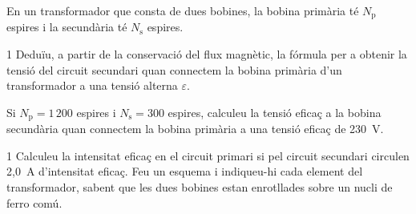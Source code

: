 En un transformador que consta de dues bobines, la bobina primària té $N_\mathrm{p}$ espires i la secundària té $N_\mathrm{s}$ espires.

\begin{apartat}{1}
Deduïu, a partir de la conservació del flux magnètic, la fórmula per a obtenir la tensió del circuit secundari quan connectem la bobina primària d'un transformador a una tensió alterna $\varepsilon$.

Si $N_\mathrm{p} = 1\,200$ espires i $N_\mathrm{s} = 300$ espires, calculeu la tensió eficaç a la bobina secundària quan connectem la bobina primària a una tensió eficaç de 230~V.
\end{apartat}

\begin{apartat}{1}
Calculeu la intensitat eficaç en el circuit primari si pel circuit secundari circulen 2,0~A d'intensitat eficaç. Feu un esquema i indiqueu-hi cada element del transformador, sabent que les dues bobines estan enrotllades sobre un nucli de ferro comú.
\end{apartat}

